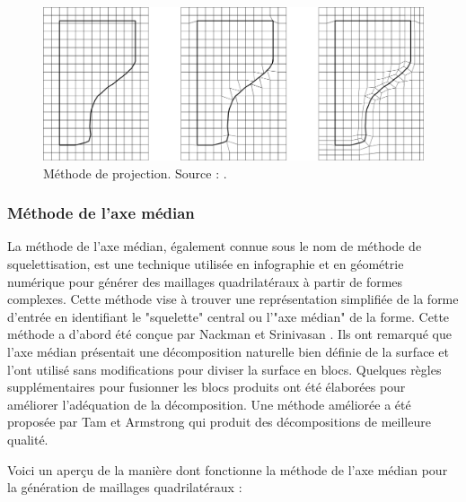  \begin{figure}[!h]
    \centering
    \includegraphics[scale=0.415]{images/superpo_grid_2.png}
    \caption{Méthode de projection. Source : \cite{schneiders1996grid}.}
    \label{fig:superpo_grid_2}
\end{figure}

\subsubsection{Méthode de l'axe médian}

La méthode de l'axe médian, également connue sous le nom de méthode de squelettisation, est une technique utilisée en infographie et en géométrie numérique pour générer des maillages quadrilatéraux à partir de formes complexes. Cette méthode vise à trouver une représentation simplifiée de la forme d'entrée en identifiant le "squelette" central ou l'"axe médian" de la forme. Cette méthode a d'abord été conçue par Nackman et Srinivasan \cite{nackman1989method}. Ils ont remarqué que l'axe médian présentait une décomposition naturelle bien définie de la surface et l'ont utilisé sans modifications pour diviser la surface en blocs. Quelques règles supplémentaires pour fusionner les blocs produits ont été élaborées pour améliorer l'adéquation de la décomposition. Une méthode améliorée a été proposée par Tam et Armstrong \cite{tam19912d} qui produit des décompositions de meilleure qualité.

Voici un aperçu de la manière dont fonctionne la méthode de l'axe médian pour la génération de maillages quadrilatéraux :\\


